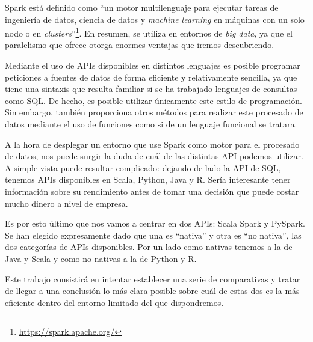 \documentclass[12pt,twoside,titlepage]{report}
\newcommand{\quotes}[1]{``#1''}
\newcommand\blankpage{%
    \newpage
    \null
    \thispagestyle{empty}%
    \newpage}
\begin{document}

\pagestyle{fancy}


\setlength{\parskip}{0.75em}
\renewcommand{\baselinestretch}{1.25}
\setcounter{page}{1}


Spark está definido como \quotes{un motor multilenguaje para ejecutar tareas de ingeniería de datos, ciencia de datos y \textit{machine learning} en máquinas con un solo nodo o en \textit{clusters}}\footnote{\url{https://spark.apache.org/}}. En resumen, se utiliza en entornos de \textit{big data}, ya que el paralelismo que ofrece otorga enormes ventajas que iremos descubriendo.

Mediante el uso de APIs disponibles en distintos lenguajes es posible programar peticiones a fuentes de datos de forma eficiente y relativamente sencilla, ya que tiene una sintaxis que resulta familiar si se ha trabajado lenguajes de consultas como SQL. De hecho, es posible utilizar únicamente este estilo de programación. Sin embargo, también proporciona otros métodos para realizar este procesado de datos mediante el uso de funciones como si de un lenguaje funcional se tratara.

A la hora de desplegar un entorno que use Spark como motor para el procesado de datos, nos puede surgir la duda de cuál de las distintas API podemos utilizar. A simple vista puede resultar complicado: dejando de lado la API de SQL, tenemos APIs disponibles en Scala, Python, Java y R. Sería interesante tener información sobre su rendimiento antes de tomar una decisión que puede costar mucho dinero a nivel de empresa.

Es por esto último que nos vamos a centrar en dos APIs: Scala Spark y PySpark. Se han elegido expresamente dado que una es \quotes{nativa} y otra es \quotes{no nativa}, las dos categorías de APIs disponibles. Por un lado como nativas tenemos a la de Java y Scala y como no nativas a la de Python y R.

Este trabajo consistirá en intentar establecer una serie de comparativas y tratar de llegar a una conclusión lo más clara posible sobre cuál de estas dos es la más eficiente dentro del entorno limitado del que dispondremos.


\end{document}
